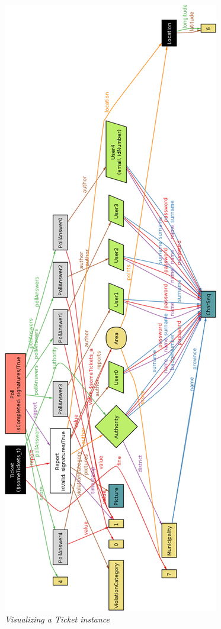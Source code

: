 \begin{figure}[H]
  \centering
  \includegraphics[origin=c,width=\textwidth,height=.95\textheight,keepaspectratio]{RASD_Images/AlloyWorlds/someTickets.jpg}
  \caption{\textit{Visualizing a Ticket instance}}
\end{figure}

